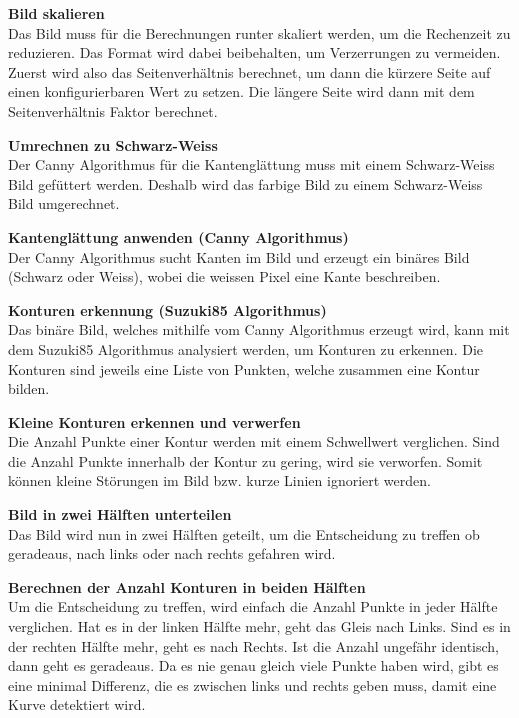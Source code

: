 \documentclass[../../main.tex]{subfiles}
\begin{document}
\textbf{Bild skalieren}\\
Das Bild muss für die Berechnungen runter skaliert werden, um die Rechenzeit zu reduzieren. Das Format
wird dabei beibehalten, um Verzerrungen zu vermeiden. Zuerst wird also das Seitenverhältnis berechnet, um dann
die kürzere Seite auf einen konfigurierbaren Wert zu setzen. Die längere Seite wird dann mit dem Seitenverhältnis Faktor
berechnet.

\textbf{Umrechnen zu Schwarz-Weiss}\\
Der Canny Algorithmus für die Kantenglättung muss mit einem Schwarz-Weiss Bild gefüttert werden. Deshalb wird das farbige Bild
zu einem Schwarz-Weiss Bild umgerechnet.

\textbf{Kantenglättung anwenden (Canny Algorithmus)}\\
Der Canny Algorithmus sucht Kanten im Bild und erzeugt ein binäres Bild (Schwarz oder Weiss), wobei die weissen Pixel eine Kante
beschreiben.

\textbf{Konturen erkennung (Suzuki85 Algorithmus)}\\
Das binäre Bild, welches mithilfe vom Canny Algorithmus erzeugt wird, kann mit dem Suzuki85 Algorithmus analysiert werden, um Konturen zu erkennen.
Die Konturen sind jeweils eine Liste von Punkten, welche zusammen eine Kontur bilden.

\textbf{Kleine Konturen erkennen und verwerfen}\\
Die Anzahl Punkte einer Kontur werden mit einem Schwellwert verglichen. Sind die Anzahl Punkte innerhalb der Kontur zu gering, wird sie verworfen.
Somit können kleine Störungen im Bild bzw. kurze Linien ignoriert werden.

\textbf{Bild in zwei Hälften unterteilen}\\
Das Bild wird nun in zwei Hälften geteilt, um die Entscheidung zu treffen ob geradeaus, nach links oder nach rechts gefahren wird.

\textbf{Berechnen der Anzahl Konturen in beiden Hälften}\\
Um die Entscheidung zu treffen, wird einfach die Anzahl Punkte in jeder Hälfte verglichen. Hat es in der linken Hälfte mehr, geht das Gleis nach Links.
Sind es in der rechten Hälfte mehr, geht es nach Rechts. Ist die Anzahl ungefähr identisch, dann geht es geradeaus. Da es nie genau gleich viele Punkte haben wird,
gibt es eine minimal Differenz, die es zwischen links und rechts geben muss, damit eine Kurve detektiert wird.
\end{document}
